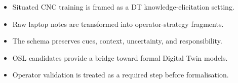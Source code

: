 \begin{itemize}
  \item Situated CNC training is framed as a DT knowledge-elicitation setting.
  \item Raw laptop notes are transformed into operator-strategy fragments.
  \item The schema preserves cues, context, uncertainty, and responsibility.
  \item OSL candidates provide a bridge toward formal Digital Twin models.
  \item Operator validation is treated as a required step before formalisation.
\end{itemize}

